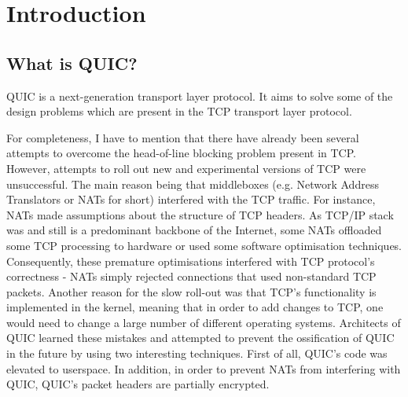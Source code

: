 \documentclass[12pt,a4paper,twoside,openright]{report}
\begin{document}

\pagestyle{headings}

\chapter{Introduction}
%





\section{What is QUIC?}

QUIC is a next-generation transport layer protocol.
It aims to solve some of the design problems which are present in the TCP transport layer protocol.


For completeness, I have to mention that there have already been several attempts to overcome the head-of-line blocking problem present in TCP.
However, attempts to roll out new and experimental versions of TCP were unsuccessful. %
The main reason being that middleboxes (e.g. Network Address Translators or NATs for short) interfered with the TCP traffic.
For instance, NATs made assumptions about the structure of TCP headers.
As TCP/IP stack was and still is a predominant backbone of the Internet, some NATs offloaded some TCP processing to hardware or used some software optimisation techniques.
Consequently, these premature optimisations interfered with TCP protocol's correctness - NATs simply rejected connections that used non-standard TCP packets.
Another reason for the slow roll-out was that TCP's functionality is implemented in the kernel, meaning that in order to add changes to TCP, one would need to change a large number of different operating systems.
Architects of QUIC learned these mistakes and attempted to prevent the ossification of QUIC in the future by using two interesting techniques.
First of all, QUIC's code was elevated to userspace.
In addition, in order to prevent NATs from interfering with QUIC, QUIC's packet headers are partially encrypted.
\end{document}

